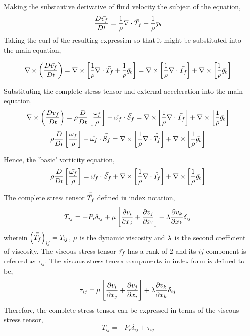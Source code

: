 \documentclass[class=report, 12pt, crop=false]{standalone}
\begin{document}
\begin{center}
Making the substantive derivative of fluid velocity the subject of the equation,
$$\frac{D\bar{v_f}}{Dt} = \frac{1}{\rho}\nabla\cdot\bar{\bar{T_f}} + \frac{1}{\rho}\bar{g_b}$$
Taking the curl of the resulting expression so that it might be substituted into the main equation,

$$\nabla\times \left(\frac{D\bar{v_f}}{Dt}\right) = \nabla\times\left[\frac{1}{\rho}\nabla\cdot\bar{\bar{T_f}} + \frac{1}{\rho}\bar{g_b}\right] = \nabla\times\left[\frac{1}{\rho}\nabla\cdot\bar{\bar{T_f}}\right] + \nabla\times\left[\frac{1}{\rho}\bar{g_b}\right]$$

Substituting the complete stress tensor and external acceleration into the main equation,
$$\nabla\times\left(\frac{D \bar{v_f}}{Dt}\right) = \rho\frac{D}{Dt}\left[\frac{\bar{\omega_f}}{\rho}\right] - \bar{\omega_f} \cdot \bar{\bar{S_f}} = \nabla\times\left[\frac{1}{\rho}\nabla\cdot\bar{\bar{T_f}}\right] + \nabla\times\left[\frac{1}{\rho}\bar{g_b}\right]$$
$$\rho\frac{D}{Dt}\left[\frac{\bar{\omega_f}}{\rho}\right] - \bar{\omega_f} \cdot \bar{\bar{S_f}} = \nabla\times\left[\frac{1}{\rho}\nabla\cdot\bar{\bar{T_f}}\right] + \nabla\times\left[\frac{1}{\rho}\bar{g_b}\right]$$

Hence, the 'basic' vorticity equation,
$$\rho\frac{D}{Dt}\left[\frac{\bar{\omega_f}}{\rho}\right] = \bar{\omega_f} \cdot \bar{\bar{S_f}} + \nabla\times\left[\frac{1}{\rho}\nabla\cdot\bar{\bar{T_f}}\right] + \nabla\times\left[\frac{1}{\rho}\bar{g_b}\right]$$


The complete stress tensor $\bar{\bar{T_f}}$ defined in index notation,
$$T_{ij} = -P_r\delta_{ij} + \mu\left[\frac{\partial v_i}{\partial x_j} + \frac{\partial v_j}{\partial x_i}\right] + \lambda\frac{\partial v_k}{\partial x_k}\delta_{ij}$$
wherein $\left(\bar{\bar{T_f}}\right)_{ij} = T_{ij}$, $\mu$ is the dynamic viscosity and $\lambda$ is the second coefficient of viscosity. The viscous stress tensor $\bar{\bar{\tau_f}}$ has a rank of $2$ and its $ij$ component is referred as $\tau_{ij}$. The viscous stress tensor components in index form is defined to be,
$$\tau_{ij} = \mu\left[\frac{\partial v_i}{\partial x_j} + \frac{\partial v_j}{\partial x_i}\right] + \lambda\frac{\partial v_k}{\partial x_k}\delta_{ij}$$
Therefore, the complete stress tensor can be expressed in terms of the viscous stress tensor,
$$T_{ij} = -P_r\delta_{ij} + \tau_{ij}$$


\end{center}
\end{document}
